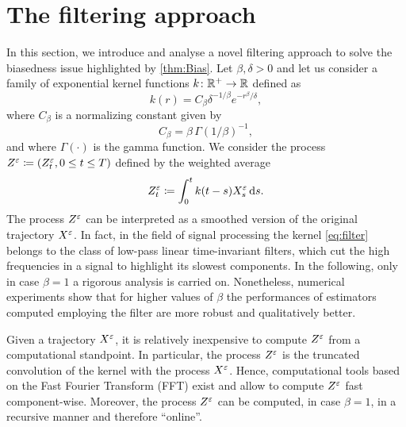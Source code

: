 \documentclass[review,onefignum,onetabnum]{siamonline190516}
\begin{document}
\section{The filtering approach}\label{sec:Filter}

In this section, we introduce and analyse a novel filtering approach to solve the biasedness issue highlighted by \cref{thm:Bias}. Let $\beta, \delta > 0$ and let us consider a family of exponential kernel functions $k \colon \mathbb{R}^+ \to \mathbb{R}$ defined as
\begin{equation}\label{eq:filter}
k(r) = C_\beta \delta^{-1/\beta} e^{-r^\beta/\delta},
\end{equation}
where $C_{\beta}$ is a normalizing constant given by
\begin{equation}
C_\beta = \beta \, \Gamma(1/\beta)^{-1},
\end{equation}
and where $\Gamma(\cdot)$ is the gamma function. We consider the process $Z^\varepsilon \coloneqq (Z^\varepsilon_t, 0 \leq t \leq T)$ defined by the weighted average
\begin{equation}\label{eq:ZDef}
	Z^{\epl}_t \defeq \int_0^t k(t - s)X^\epl_s \dd s.
\end{equation}
The process $Z^\varepsilon$ can be interpreted as a smoothed version of the original trajectory $X^\varepsilon$. In fact, in the field of signal processing the kernel \eqref{eq:filter} belongs to the class of low-pass linear time-invariant filters, which cut the high frequencies in a signal to highlight its slowest components. In the following, only in case $\beta = 1$ a rigorous analysis is carried on. Nonetheless, numerical experiments show that for higher values of $\beta$ the performances of estimators computed employing the filter are more robust and qualitatively better. 

\begin{remark} Given a trajectory $X^\varepsilon$, it is relatively inexpensive to compute $Z^\varepsilon$ from a computational standpoint. In particular, the process $Z^\varepsilon$ is the truncated convolution of the kernel with the process $X^\varepsilon$. Hence, computational tools based on the Fast Fourier Transform (FFT) exist and allow to compute $Z^\varepsilon$ fast component-wise. Moreover, the process $Z^\varepsilon$ can be computed, in case $\beta = 1$, in a recursive manner and therefore ``online''.
\end{remark}
\end{document}
